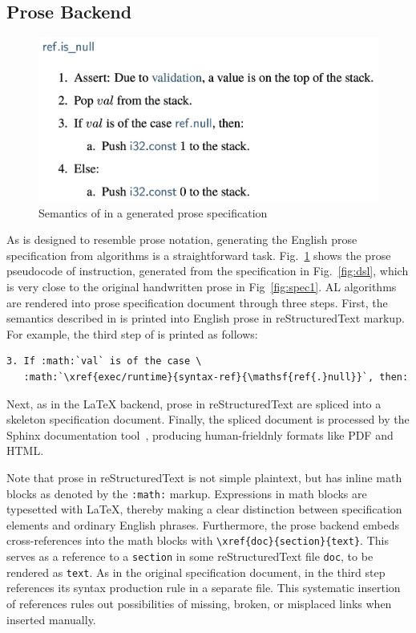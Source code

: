 \subsection{Prose Backend}\label{sec:prose} %
\begin{figure}[t]
\centering
\includegraphics[width=.5\textwidth]{../img/genprose}
\vspace*{-1em}
\caption{Semantics of  in a generated prose specification}
\label{fig:genprose}
\end{figure}

As \al is designed to resemble prose notation, 
generating the English prose specification from \al algorithms is a straightforward task.
Fig.~\ref{fig:genprose} shows the prose pseudocode of  instruction,
generated from the specification in Fig.~\ref{fig:dsl},
which is very close to the original handwritten prose in Fig~\ref{fig:spec1}.
AL algorithms are rendered into prose specification document through three steps.
First, the semantics described in \al is printed into English prose in reStructuredText markup.
For example, the third step of  is printed as follows:
\begin{verbatim}
3. If :math:`val` is of the case \
   :math:`\xref{exec/runtime}{syntax-ref}{\mathsf{ref{.}null}}`, then:
\end{verbatim}
Next, as in the LaTeX backend, prose in reStructuredText are spliced into a skeleton specification document.
Finally, the spliced document is processed by the Sphinx documentation tool~\cite{sphinx},
producing human-frieldnly formats like PDF and HTML.

Note that prose in reStructuredText is not simple plaintext,
but has inline math blocks as denoted by the \texttt{:math:} markup.
Expressions in math blocks are typesetted with LaTeX, thereby
making a clear distinction between specification elements and ordinary English phrases.
Furthermore, the prose backend embeds cross-references into the math blocks 
with \texttt{\textbackslash xref\{doc\}\{section\}\{text\}}.
This serves as a reference to a \texttt{section}
in some reStructuredText file \texttt{doc}, to be rendered as \texttt{text}.
As in the original specification document, 
 in the third step references its syntax production rule in a separate file.
This systematic insertion of references rules out
possibilities of missing, broken, or misplaced links when inserted manually.

